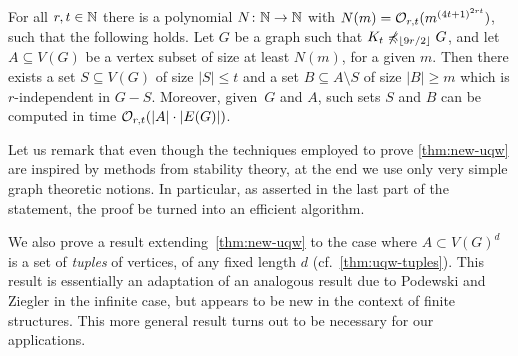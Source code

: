 \begin{theorem}\label{thm:new-uqw}
For all $r,t\in \mathbb{N}$ there is a polynomial  $N\colon \mathbb{N}\to \mathbb{N}$ with $N(m)=
\mathcal{O}_{r,t}{(m^{{(4t+1)}^{2rt}})}$, such that the following holds.
Let $G$ be a graph such that $K_t\not\preccurlyeq_{\lfloor 9r/2\rfloor} G$, and
let $A\subseteq V(G)$ be a vertex subset of size at least $N(m)$, for a given $m$.
Then there exists a set $S\subseteq V(G)$ of size $|S|\leq t$ and a set $B\subseteq A\setminus S$ 
of size $|B|\geq m$ which is $r$-independent in $G-S$.
Moreover, given~$G$ and $A$, such sets $S$ and $B$ can be computed in time $\mathcal{O}_{r,t}(|A|\cdot |E(G)|)$. 
\end{theorem}

Let us remark
that even though the techniques employed to prove \cref{thm:new-uqw} are inspired by methods from stability theory, 
at the end we use only very simple graph theoretic notions. In particular, as asserted in the last part of the statement, the
proof  be turned into an efficient algorithm.

We also prove a result extending~\cref{thm:new-uqw}
to the case where $A\subset V(G)^d$ is a set of \emph{tuples} of vertices, of any fixed length $d$ (cf.~\cref{thm:uqw-tuples}).
This result is essentially an adaptation of an analogous result due to Podewski and Ziegler in the infinite case,
but appears to be new in the context of finite structures.
This more general result turns out to be necessary for our applications.

